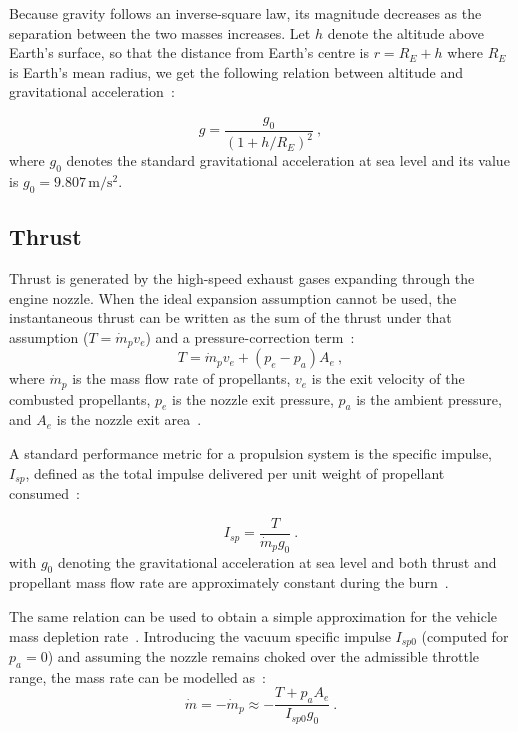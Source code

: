 Because gravity follows an inverse-square law, its magnitude decreases as the separation between the two masses increases. Let $h$ denote the altitude above Earth's surface, so that the distance from Earth's centre is $r = R_E + h$ where $R_E$ is Earth's mean radius, we get the following relation between altitude and gravitational acceleration~\cite{curtis2020orbital}:

\begin{equation}
g = \frac{g_0}{\left(1 + h/R_E\right)^2} \ ,
\end{equation}
where $g_0$ denotes the standard gravitational acceleration at sea level and its value is $g_0 = 9.807\,\mathrm{m/s^2}$.


\subsection{Thrust}

Thrust is generated by the high-speed exhaust gases expanding through the engine nozzle. When the ideal expansion assumption cannot be used, the instantaneous thrust can be written as the sum of the thrust under that assumption ($T = \dot m_p v_e$) and a pressure-correction term~\cite{Edberg}:
\begin{equation}
T = \dot m_p v_e + \left(p_e - p_a\right)A_e \ ,
\end{equation}
where $\dot m_p$ is the mass flow rate of propellants, $v_e$ is the exit velocity of the combusted propellants, $p_e$ is the nozzle exit pressure, $p_a$ is the ambient pressure, and $A_e$ is the nozzle exit area~\cite{Edberg, sutton2017rocket}.

A standard performance metric for a propulsion system is the specific impulse, $I_{sp}$, defined as the total impulse delivered per unit weight of propellant consumed~\cite{sutton2017rocket}:

\begin{equation}
I_{sp} = \frac{T}{\dot{m}_p g_0} \ .
\end{equation}
with $g_0$ denoting the gravitational acceleration at sea level and both thrust and propellant mass flow rate are approximately constant during the burn~\cite{sutton2017rocket}.

The same relation can be used to obtain a simple approximation for the vehicle mass depletion rate~\cite{sutton2017rocket}. Introducing the vacuum specific impulse $I_{sp0}$ (computed for $p_a=0$) and assuming the nozzle remains choked over the admissible throttle range, the mass rate can be modelled as~\cite{sutton2017rocket}:
\begin{equation}
\dot{m} = -\dot{m}_p \approx -\frac{T + p_a A_e}{I_{sp0} g_0} \ .
\end{equation}

